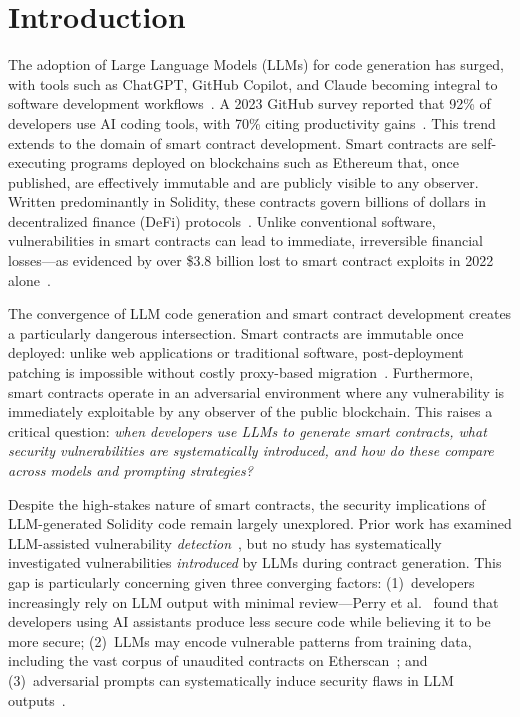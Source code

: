 \section{Introduction}
\label{sec:intro}

The adoption of Large Language Models (LLMs) for code generation has surged, with tools such as ChatGPT, GitHub Copilot, and Claude becoming integral to software development workflows~\cite{copilot_eval, fan2023large, hou2024large}. A 2023 GitHub survey reported that 92\% of developers use AI coding tools, with 70\% citing productivity gains~\cite{github_copilot}. This trend extends to the domain of smart contract development. Smart contracts are self-executing programs deployed on blockchains such as Ethereum that, once published, are effectively immutable and are publicly visible to any observer. Written predominantly in Solidity, these contracts govern billions of dollars in decentralized finance (DeFi) protocols~\cite{werner2022sok, zhou2023sok}. Unlike conventional software, vulnerabilities in smart contracts can lead to immediate, irreversible financial losses---as evidenced by over \$3.8 billion lost to smart contract exploits in 2022 alone~\cite{chainalysis2023}.

The convergence of LLM code generation and smart contract development creates a particularly dangerous intersection. Smart contracts are immutable once deployed: unlike web applications or traditional software, post-deployment patching is impossible without costly proxy-based migration~\cite{chen2020defining}. Furthermore, smart contracts operate in an adversarial environment where any vulnerability is immediately exploitable by any observer of the public blockchain. This raises a critical question: \emph{when developers use LLMs to generate smart contracts, what security vulnerabilities are systematically introduced, and how do these compare across models and prompting strategies?}

Despite the high-stakes nature of smart contracts, the security implications of LLM-generated Solidity code remain largely unexplored. Prior work has examined LLM-assisted vulnerability \emph{detection}~\cite{gptscan, smartllmsentry, david2023you}, but no study has systematically investigated vulnerabilities \emph{introduced} by LLMs during contract generation. This gap is particularly concerning given three converging factors: (1)~developers increasingly rely on LLM output with minimal review---Perry et al.~\cite{perry2023users} found that developers using AI assistants produce less secure code while believing it to be more secure; (2)~LLMs may encode vulnerable patterns from training data, including the vast corpus of unaudited contracts on Etherscan~\cite{schuster2021you}; and (3)~adversarial prompts can systematically induce security flaws in LLM outputs~\cite{kang2024exploiting}.

